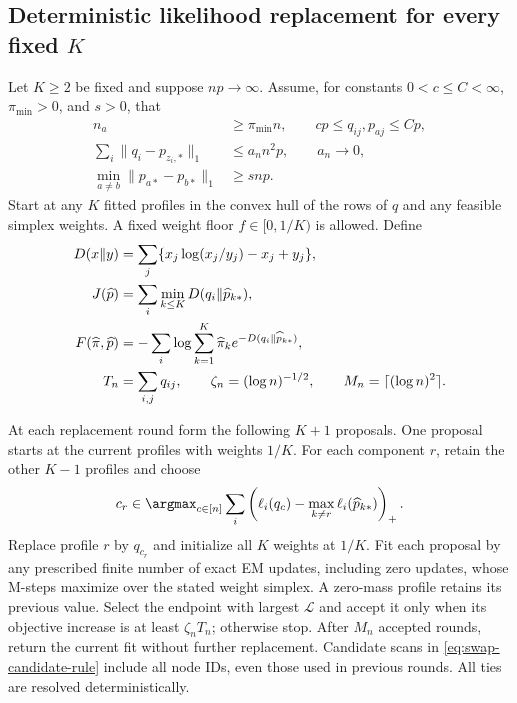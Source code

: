 \subsection{Deterministic likelihood replacement for every fixed \texorpdfstring{$K$}{K}}

\begin{lemma}
\label{lem:iterative-swap-certification}
Let $K\ge2$ be fixed and suppose $np\to\infty$.
Assume, for constants $0<c\le C<\infty$,
$\pi_{\min}>0$, and $s>0$, that
\begin{align}
 n_a&\ge\pi_{\min}n,\qquad
 cp\le q_{ij},p_{aj}\le Cp,
 \label{eq:swap-profile-box}\\
 \sum_i\|q_i-p_{z_i,*}\|_1&\le a_n n^2p,
 \qquad a_n\longrightarrow0,
 \label{eq:swap-average-error}\\
 \min_{a\ne b}\|p_{a*}-p_{b*}\|_1&\ge s np.
 \label{eq:swap-profile-separation}
\end{align}
Start at any $K$ fitted profiles in the convex hull of the rows of $q$
and any feasible simplex weights. A fixed weight floor
$f\in[0,1/K)$ is allowed. Define
\begin{align}
 D(x\Vert y)&=\sum_j\{x_j\log(x_j/y_j)-x_j+y_j\},\notag\\
 J(\widehat p)&=\sum_i\min_{k\le K}D(q_i\Vert\widehat p_{k*}),
 \label{eq:swap-hard-cost}\\
 F(\widehat\pi,\widehat p)
 &=-\sum_i\log\sum_{k=1}^K\widehat\pi_k
       e^{-D(q_i\Vert\widehat p_{k*})},
 \label{eq:swap-soft-cost}\\
 T_n&=\sum_{i,j}q_{ij},\qquad
 \zeta_n=(\log n)^{-1/2},\qquad
 M_n=\lceil(\log n)^2\rceil.
 \label{eq:swap-stopping-constants}
\end{align}

At each replacement round form the following $K+1$ proposals.
One proposal starts at the current profiles with weights $1/K$.
For each component $r$, retain the other $K-1$ profiles and choose
\begin{equation}
 c_r\in\argmax_{c\in[n]}
 \sum_i\left(\ell_i(q_c)-\max_{k\ne r}
                         \ell_i(\widehat p_{k*})\right)_+.
 \label{eq:swap-candidate-rule}
\end{equation}
Replace profile $r$ by $q_{c_r}$ and initialize all $K$ weights at
$1/K$. Fit each proposal by any prescribed finite number of exact EM
updates, including zero updates, whose M-steps maximize over the stated
weight simplex. A zero-mass profile retains its previous value.
Select the endpoint with largest $\mathcal L$ and accept it only when
its objective increase is at least $\zeta_nT_n$; otherwise stop.
After $M_n$ accepted rounds, return the current fit without further
replacement. Candidate scans in \eqref{eq:swap-candidate-rule} include
all node IDs, even those used in previous rounds. All ties are resolved
deterministically.


\end{lemma}
